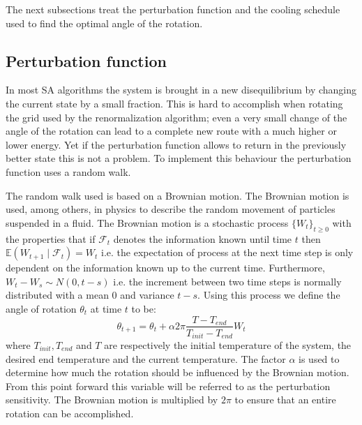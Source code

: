 The next subsections treat the perturbation function and the cooling schedule used
to find the optimal angle of the rotation.

\subsection{Perturbation function}\label{sec:per}
In most SA algorithms the system is brought in a new disequilibrium by
changing the current state by a small fraction. This is hard to accomplish
when rotating the grid used by the renormalization algorithm; even a very
small change of the angle of the rotation can lead to a complete new route
with a much higher or lower energy. Yet if the perturbation function allows to
return in the previously better state this is not a problem. To implement this
behaviour the perturbation function uses a random walk.

\newcommand{\expt}{\ensuremath{\mathbb{E}}}
The random walk used is based on a Brownian motion\cite{brown1829bam}. The
Brownian motion is used, among others, in physics to describe the random
movement of particles suspended in a fluid. The Brownian motion is
a stochastic process $\lbrace W_t\rbrace_{t\geq 0}$ with the properties that
if $\mathcal{F}_t$ denotes the information known until time $t$ then 
$\expt(W_{t + 1}\mid \mathcal{F}_t) = W_t$ i.e. the
expectation of process at the next time step is only dependent on the
information known up to the current time. Furthermore, $W_t - W_s \sim N(0, t
- s)$ i.e. the increment between two time steps is normally distributed with a
mean 0 and variance $t - s$. Using this process we define the angle of
rotation $\theta_t$ at time $t$ to be: 
\begin{equation}\label{eq:rot}
\theta_{t + 1} = \theta_{t} + \alpha 2\pi\frac{T - T_{end}}
	{T_{init} - T_{end}}W_t
\end{equation}
where $T_{init}, T_{end}$ and $T$ are respectively the initial temperature of
the system, the desired end temperature and the current temperature. The
factor $\alpha$ is used to determine how much the rotation should be influenced
by the Brownian motion. From this point forward this variable will be referred
to as the perturbation sensitivity. The Brownian motion is multiplied by
$2\pi$ to ensure that an entire rotation can be accomplished.

